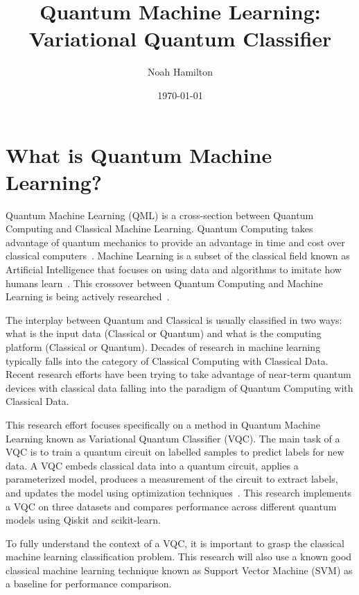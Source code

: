 \documentclass[11pt]{article}
\begin{document}
	
	\title{Quantum Machine Learning: Variational Quantum Classifier}
	\author{Noah Hamilton}
	\date{\today}
	
	\maketitle
	\tableofcontents

\newpage
\section{What is Quantum Machine Learning?}\label{intro}

Quantum Machine Learning (QML) is a cross-section between Quantum Computing and Classical Machine Learning. 
Quantum Computing takes advantage of quantum mechanics to provide an advantage in time and 
cost over classical computers~\cite{garcía2022systematic}. Machine Learning is a subset of the classical field known
 as Artificial Intelligence that focuses on using data and algorithms to imitate how humans learn~\cite{IBM}.
 This crossover between Quantum Computing and Machine Learning is being actively researched~\cite{garcía2022systematic}.
 
 The interplay between Quantum and Classical is usually classified in two ways: what is the input data (Classical or Quantum)
 and what is the computing platform (Classical or Quantum). Decades of research in machine learning typically falls into the
 category of Classical Computing with Classical Data. Recent research efforts have been trying to take advantage of 
 near-term quantum devices with classical data falling into the paradigm of Quantum Computing with Classical Data.

 This research effort focuses specifically on a method in Quantum Machine Learning known as Variational Quantum Classifier (VQC).
 The main task of a VQC is to train a quantum circuit on labelled samples to predict labels for new data.
 A VQC embeds classical data into a quantum circuit, applies a parameterized model, produces a measurement of the circuit to
extract labels, and updates the model using optimization techniques~\cite{BuildingAVQC}. This research implements a VQC on three
datasets and compares performance across different quantum models using Qiskit and scikit-learn. 

To fully understand the context of a VQC, it is important to grasp the classical machine learning classification problem.
This research will also use a known good classical machine learning technique known as Support Vector Machine (SVM) as a baseline
for performance comparison.
\end{document}
